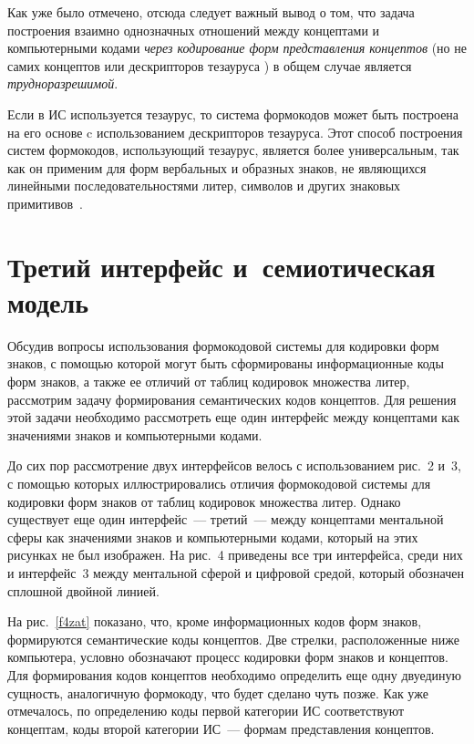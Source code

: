 \begin{multicols}{2}
   Как уже было отмечено, отсюда следует важный вывод о том, что задача построения 
взаимно однозначных отношений между концептами и компьютерными кодами \textit{через 
кодирование форм представления концептов} (но не самих концептов или дескрипторов 
тезауруса ) в общем случае является \textit{трудноразрешимой}.
   
   Если в ИС используется тезаурус, то система формокодов может быть построена на его 
основе c использованием дескрипторов тезауруса. Этот способ построения систем 
формокодов, использующий тезаурус, является более универсальным, так как он применим 
для форм вербальных и образных знаков, не являющихся линейными последовательностями 
литер, символов и других знаковых примитивов~\cite{38zat}.

\section{Третий интерфейс и~семиотическая модель}
   
   Обсудив вопросы использования формокодовой системы для кодировки форм знаков, с 
по\-мощью которой могут быть сформированы информационные коды форм знаков, а также 
ее отличий от таблиц кодировок множества литер, рассмотрим задачу формирования 
семантических кодов концептов. Для решения этой задачи необходимо рассмотреть еще 
один интерфейс между концептами как значениями знаков и компьютерными кодами.
   
   До сих пор рассмотрение двух интерфейсов велось с использованием рис.~2 и~3, 
   с помощью которых иллюстрировались отличия формокодовой системы для 
кодировки форм знаков от таблиц кодировок множества литер. Однако существует еще один 
интерфейс~--- третий~--- между концептами ментальной сферы как значениями знаков и 
компьютерными кодами, который на этих рисунках не был изображен. На рис.~4 
приведены все три интерфейса, среди них и интерфейс~3 между ментальной сферой и 
цифровой средой, который обозначен сплошной двойной линией.
   
   На рис.~\ref{f4zat} показано, что, кроме информационных кодов форм знаков, 
формируются семантические коды концептов. Две стрелки, расположенные ниже 
компьютера, условно обозначают процесс кодировки форм знаков и концептов. Для 
формирования кодов концептов необходимо определить еще одну двуединую сущность, 
аналогичную формокоду, что будет сделано чуть позже. Как уже отмечалось, по 
определению коды первой категории ИС соответствуют концептам, коды второй категории 
ИС~--- формам представления концептов.
   

\end{multicols}
